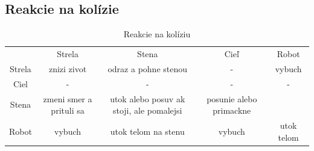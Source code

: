 \subsection{Reakcie na kolízie}
\begin{table}
\centering
\caption {Reakcie na kolíziu}
\begin{tabular}{| c |c|c|c|c|}
& Strela & Stena & Cieľ & Robot \\
Strela & znizi zivot & odraz a pohne stenou & - & vybuch \\
Ciel & - & - & - & - \\
Stena &zmeni smer a prituli sa & utok alebo posuv ak stoji, ale pomalejsi & posunie alebo primackne \\
Robot & vybuch & utok telom na stenu & vybuch & utok telom \\
\end{tabular}
\end{table}
